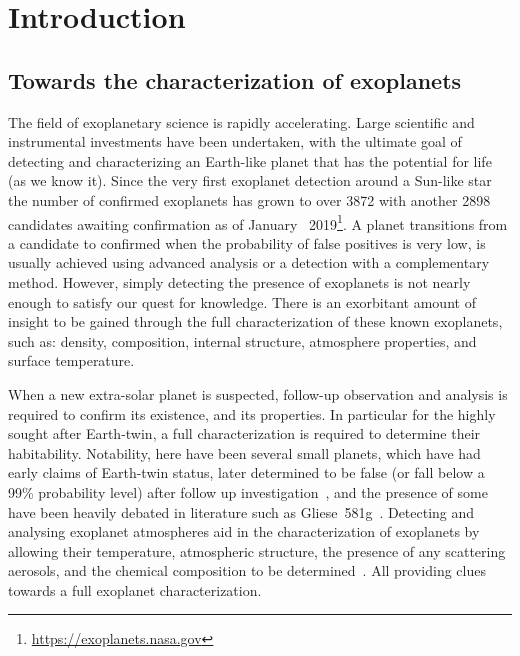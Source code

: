 
\chapter{Introduction}\label{cha:introduction}

\section{Towards the characterization of exoplanets}

The field of exoplanetary science is rapidly accelerating.
Large scientific and instrumental investments have been undertaken, with the ultimate goal of detecting and characterizing an Earth-like planet that has the potential for life (as we know it).
Since the very first exoplanet detection around a Sun-like star~\citep{mayor_jupitermass_1995} the number of confirmed exoplanets has grown to over 3872 with another 2898 candidates awaiting confirmation as of January~ 2019\footnote{\href{https://exoplanets.nasa.gov/}{https://exoplanets.nasa.gov}}.
A planet transitions from a candidate to confirmed when the probability of false positives is very low, is usually achieved using advanced analysis or a detection with a complementary method.
However, simply detecting the presence of exoplanets is not nearly enough to satisfy our quest for knowledge.
There is an exorbitant amount of insight to be gained through the full characterization of these known exoplanets, such as: density, composition, internal structure, atmosphere properties, and surface temperature.

When a new extra-solar planet is suspected, follow-up observation and analysis is required to confirm its existence, and its properties.
In particular for the highly sought after Earth-twin, a full characterization is required to determine their habitability.
Notability, here have been several small planets, which have had early claims of Earth-twin status, later determined to be false (or fall below a 99\% probability level) after follow up investigation~\citep[e.g.][]{mullally_kepler_2018,burke_reevaluating_2019}, and the presence of some have been heavily debated in literature such as {Gliese~581g}~\citep{vogt_lickcarnegie_2010, gregory_bayesian_2011,robertson_stellar_2014}.
Detecting and analysing exoplanet atmospheres aid in the characterization of exoplanets by allowing their temperature, atmospheric structure, the presence of any scattering aerosols, and the chemical composition to be determined~\citep[e.g.][and references therein]{kreidber_exoplanet_2018}.
All providing clues towards a full exoplanet characterization.

